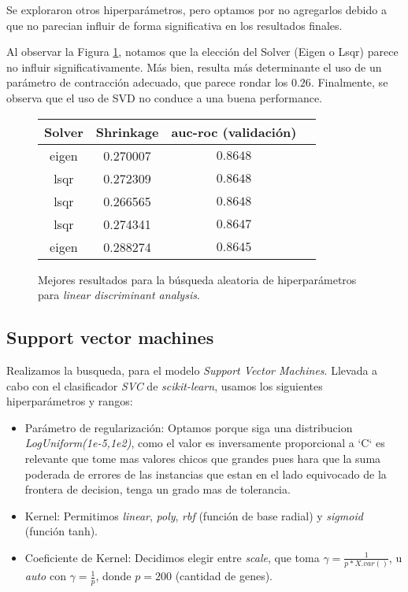 Se exploraron otros hiperparámetros, pero optamos por no agregarlos debido a que no parecian influir de forma significativa en los resultados finales. 

Al observar la Figura \ref{lda}, notamos que la elección del Solver (Eigen o Lsqr) parece no influir significativamente. Más bien, resulta más determinante el uso de un parámetro de contracción adecuado, que parece rondar los $0.26$. Finalmente, se observa que el uso de SVD no conduce a una buena performance.

\vspace{0.5em}
\begin{figure}[!htbp]
    \begin{center}
        \begin{tabular}{ |c|c|c|c| } 
         \hline
        Solver   & Shrinkage & auc-roc (validación) \\
        \hline
        eigen                   &  0.270007          & $0.8648$  \\ 
        lsqr                    &  0.272309          & $0.8648$  \\
        lsqr                    &  0.266565          & $0.8648$  \\ 
        lsqr                    &  0.274341          & $0.8647$  \\
        eigen                   &  0.288274          & $0.8645$  \\ 
        \hline
        \end{tabular}
    \end{center}
    \caption{Mejores resultados para la búsqueda aleatoria de hiperparámetros para \textit{linear discriminant analysis}.} \label{lda}
\end{figure}

\subsection{Support vector machines}
Realizamos la busqueda, para el modelo \textit{Support Vector Machines}. Llevada a cabo con el clasificador \textit{SVC} de \textit{scikit-learn}, usamos los siguientes hiperparámetros y rangos: 

\begin{itemize}
    \item Parámetro de regularización: Optamos porque siga una distribucion \textit{LogUniform(1e-5,1e2)}, como el valor es inversamente proporcional a `C` es relevante que tome mas valores chicos que grandes pues hara que la suma poderada de errores de las instancias que estan en el lado equivocado de la frontera de decision, tenga un grado mas de tolerancia.
    \item Kernel: Permitimos \textit{linear}, \textit{poly}, \textit{rbf} (función de base radial) y \textit{sigmoid} (función tanh).
    \item Coeficiente de Kernel: Decidimos elegir entre \textit{scale}, que toma $ \gamma = \frac{1}{p*X.var()}$, u \textit{auto} con $\gamma = \frac{1}{p} $, donde $p=200$ (cantidad de genes).
\end{itemize}

